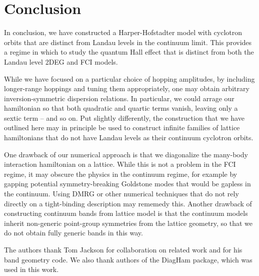 \documentclass[aps,prb,twocolumn,letterpaper,twoside,nobalancelastpage,groupedaddress,amsmath,amssymb,floatfix,citeautoscript]{revtex4-1}
\begin{document}

\section{Conclusion}
In conclusion, we have constructed a Harper-Hofstadter model with cyclotron orbits that are distinct from Landau levels in the continuum limit. This provides a regime in which to study the quantum Hall effect that is distinct from both the Landau level 2DEG and FCI models. 

While we have focused on a particular choice of hopping amplitudes, by including longer-range hoppings and tuning them appropriately, one may obtain arbitrary inversion-symmetric dispersion relations. In particular, we could arrage our hamiltonian so that both quadratic and quartic terms vanish, leaving only a sextic term -- and so on. Put slightly differently, the construction that we have outlined here may in principle be used to construct infinite families of lattice hamiltonians that do not have Landau levels as their continuum cyclotron orbits.

One drawback of our numerical approach is that we diagonalize the many-body interaction hamiltonian on a lattice. While this is not a problem in the FCI regime, it may obscure the physics in the continuum regime, for example by gapping potential symmetry-breaking Goldstone modes that would be gapless in the continuum. Using DMRG or other numerical techniques that do not rely directly on a tight-binding description may rememedy this. Another drawback of constructing continuum bands from lattice model is that the continuum models inherit non-generic point-group symmetries from the lattice geometry, so that we do not obtain fully generic bands in this way.

\begin{acknowledgments}
The authors thank Tom Jackson for collaboration on related work and for his band geometry code. We also thank authors of the DiagHam package, which was used in this work.

\end{acknowledgments}


%
\end{document}
